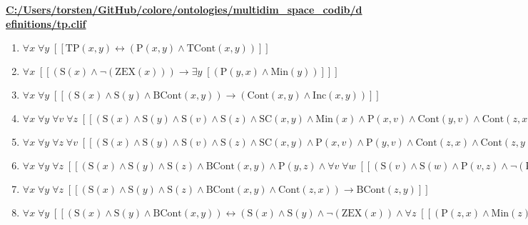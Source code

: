 \documentclass{article}
\begin{document}
\textbf{\url{C:/Users/torsten/GitHub/colore/ontologies/multidim\_space\_codib/definitions/tp.clif}}

\begin{enumerate}
\item $\forall x\; \forall y\;  \left[ \left[ \textrm{TP}(x,y) \leftrightarrow \left(\textrm{P}(x,y) \land \textrm{TCont}(x,y)\right) \right] \right]$
\item $\forall x\;  \left[ \left[ \left(\textrm{S}(x) \land \neg \left(\textrm{ZEX}(x)\right)\right) \rightarrow \exists y\;  \left[ \left(\textrm{P}(y,x) \land \textrm{Min}(y)\right) \right] \right] \right]$
\item $\forall x\; \forall y\;  \left[ \left[ \left(\textrm{S}(x) \land \textrm{S}(y) \land \textrm{BCont}(x,y)\right) \rightarrow \left(\textrm{Cont}(x,y) \land \textrm{Inc}(x,y)\right) \right] \right]$
\item $\forall x\; \forall y\; \forall v\; \forall z\;  \left[ \left[ \left(\textrm{S}(x) \land \textrm{S}(y) \land \textrm{S}(v) \land \textrm{S}(z) \land \textrm{SC}(x,y) \land \textrm{Min}(x) \land \textrm{P}(x,v) \land \textrm{Cont}(y,v) \land \textrm{Cont}(z,x) \land \textrm{Cont}(z,y)\right) \rightarrow \textrm{BCont}(z,x) \right] \right]$
\item $\forall x\; \forall y\; \forall z\; \forall v\;  \left[ \left[ \left(\textrm{S}(x) \land \textrm{S}(y) \land \textrm{S}(v) \land \textrm{S}(z) \land \textrm{SC}(x,y) \land \textrm{P}(x,v) \land \textrm{P}(y,v) \land \textrm{Cont}(z,x) \land \textrm{Cont}(z,y) \land \textrm{Covers}(v,z)\right) \rightarrow \neg \left(\textrm{BCont}(z,v)\right) \right] \right]$
\item $\forall x\; \forall y\; \forall z\;  \left[ \left[ \left(\textrm{S}(x) \land \textrm{S}(y) \land \textrm{S}(z) \land \textrm{BCont}(x,y) \land \textrm{P}(y,z) \land \forall v\; \forall w\;  \left[ \left[ \left(\textrm{S}(v) \land \textrm{S}(w) \land \textrm{P}(v,z) \land \neg \left(\textrm{PO}(v,y)\right) \land \textrm{P}(w,x)\right) \rightarrow \neg \left(\textrm{Cont}(w,v)\right) \right] \right]\right) \rightarrow \textrm{BCont}(x,z) \right] \right]$
\item $\forall x\; \forall y\; \forall z\;  \left[ \left[ \left(\textrm{S}(x) \land \textrm{S}(y) \land \textrm{S}(z) \land \textrm{BCont}(x,y) \land \textrm{Cont}(z,x)\right) \rightarrow \textrm{BCont}(z,y) \right] \right]$
\item $\forall x\; \forall y\;  \left[ \left[ \left(\textrm{S}(x) \land \textrm{S}(y) \land \textrm{BCont}(x,y)\right) \leftrightarrow \left(\textrm{S}(x) \land \textrm{S}(y) \land \neg \left(\textrm{ZEX}(x)\right) \land \forall z\;  \left[ \left[ \left(\textrm{P}(z,x) \land \textrm{Min}(z)\right) \rightarrow \textrm{BCont}(z,y) \right] \right]\right) \right] \right]$

\end{enumerate}
\end{document}
